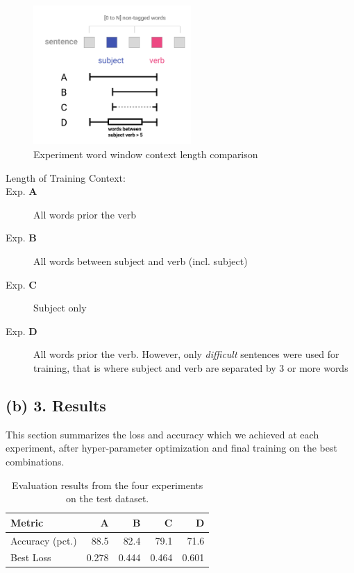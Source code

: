 \documentclass{article}
\begin{document}
\begin{figure}[h]
\centering
\includegraphics[width=6cm]{figures/window.pdf}
\caption{Experiment word window context length comparison}
\end{figure}

\begin{description}
\item[Length of Training Context:]
\item[Exp. \textbf{A}] All words prior the verb
\item[Exp. \textbf{B}] All words between subject and verb (incl. subject)
\item[Exp. \textbf{C}] Subject only
\item[Exp. \textbf{D}] All words prior the verb. However, only \textit{difficult} sentences were used for training, that is where subject and verb are separated by 3 or more words
\end{description}


\subsection*{(b) 3. Results}

This section summarizes the loss and accuracy which we achieved at each experiment, after hyper-parameter optimization and final training on the best combinations.


\begin{table}[h!]
\begin{center}
\begin{scriptsize}
\begin{tabular}{lrrrr}
\hline
\abovespace\belowspace
Metric & A & B & C & D \\
\hline
\abovespace
Accuracy (pct.) & 88.5 & 82.4 & 79.1 & 71.6 \\
Best Loss & 0.278 & 0.444 & 0.464 & 0.601 \\
\hline
\end{tabular}
\end{scriptsize}
\caption{Evaluation results from the four experiments on the test dataset.}
\end{center}
\end{table}
\end{document}
